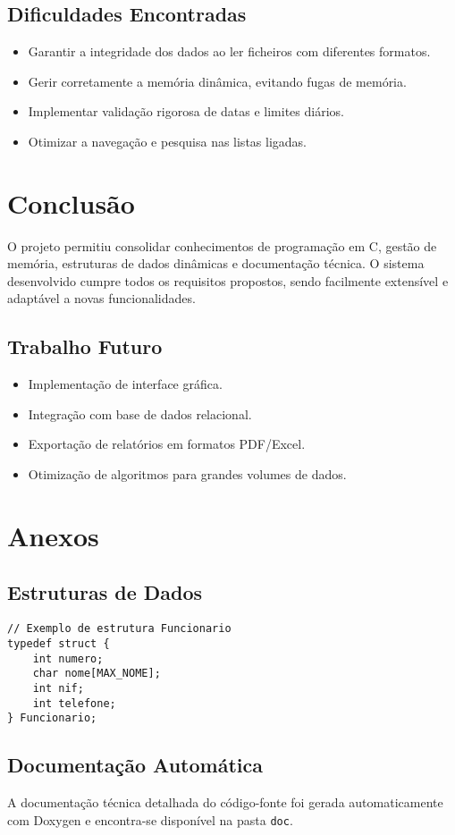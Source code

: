 \documentclass[a4paper,12pt]{report}
\begin{document}
\section{Dificuldades Encontradas}
\begin{itemize}
    \item Garantir a integridade dos dados ao ler ficheiros com diferentes formatos.
    \item Gerir corretamente a memória dinâmica, evitando fugas de memória.
    \item Implementar validação rigorosa de datas e limites diários.
    \item Otimizar a navegação e pesquisa nas listas ligadas.
\end{itemize}

\chapter{Conclusão}
O projeto permitiu consolidar conhecimentos de programação em C, gestão de memória, estruturas de dados dinâmicas e documentação técnica. O sistema desenvolvido cumpre todos os requisitos propostos, sendo facilmente extensível e adaptável a novas funcionalidades.

\section{Trabalho Futuro}
\begin{itemize}
    \item Implementação de interface gráfica.
    \item Integração com base de dados relacional.
    \item Exportação de relatórios em formatos PDF/Excel.
    \item Otimização de algoritmos para grandes volumes de dados.
\end{itemize}

\chapter{Anexos}
\section{Estruturas de Dados}
\begin{verbatim}
// Exemplo de estrutura Funcionario
typedef struct {
    int numero;
    char nome[MAX_NOME];
    int nif;
    int telefone;
} Funcionario;
\end{verbatim}

\section{Documentação Automática}
A documentação técnica detalhada do código-fonte foi gerada automaticamente com Doxygen e encontra-se disponível na pasta \texttt{doc}.
\end{document}

